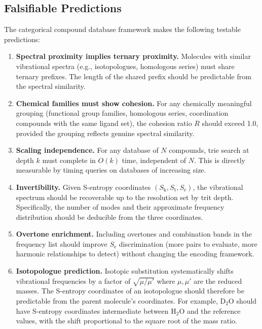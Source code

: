 \documentclass[11pt,twocolumn,a4paper]{article}
\theoremstyle{definition}
\theoremstyle{remark}
\newcommand{\Sk}{S_{\mathrm{k}}}
\newcommand{\St}{S_{\mathrm{t}}}
\newcommand{\Se}{S_{\mathrm{e}}}
\begin{document}
\subsection{Falsifiable Predictions}

The categorical compound database framework makes the following testable predictions:

\begin{enumerate}
\item \textbf{Spectral proximity implies ternary proximity.} Molecules with similar vibrational spectra (e.g., isotopologues, homologous series) must share ternary prefixes. The length of the shared prefix should be predictable from the spectral similarity.

\item \textbf{Chemical families must show cohesion.} For any chemically meaningful grouping (functional group families, homologous series, coordination compounds with the same ligand set), the cohesion ratio $R$ should exceed 1.0, provided the grouping reflects genuine spectral similarity.

\item \textbf{Scaling independence.} For any database of $N$ compounds, trie search at depth $k$ must complete in $O(k)$ time, independent of $N$. This is directly measurable by timing queries on databases of increasing size.

\item \textbf{Invertibility.} Given S-entropy coordinates $(\Sk, \St, \Se)$, the vibrational spectrum should be recoverable up to the resolution set by trit depth. Specifically, the number of modes and their approximate frequency distribution should be deducible from the three coordinates.

\item \textbf{Overtone enrichment.} Including overtones and combination bands in the frequency list should improve $\Se$ discrimination (more pairs to evaluate, more harmonic relationships to detect) without changing the encoding framework.

\item \textbf{Isotopologue prediction.} Isotopic substitution systematically shifts vibrational frequencies by a factor of $\sqrt{\mu/\mu'}$ where $\mu, \mu'$ are the reduced masses. The S-entropy coordinates of an isotopologue should therefore be predictable from the parent molecule's coordinates. For example, D$_2$O should have S-entropy coordinates intermediate between H$_2$O and the reference values, with the shift proportional to the square root of the mass ratio.
\end{enumerate}
\end{document}
